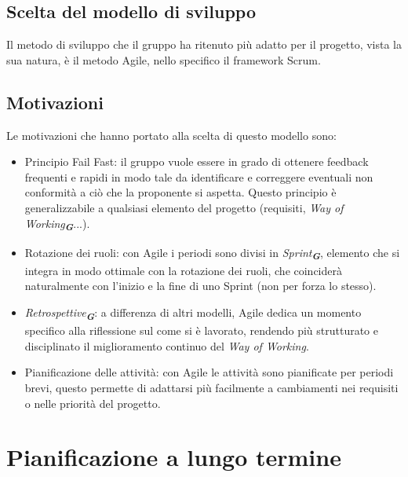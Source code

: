 \documentclass[a4paper,12pt]{article}
\newcommand{\glossario}[1]{\textit{#1}\textsubscript{\textbf{\textit{\textcolor{lightblack}{G}}}}}
\begin{document}
\subsection{Scelta del modello di sviluppo}
Il metodo di sviluppo che il gruppo ha ritenuto più adatto per il progetto, vista la sua natura, è il metodo Agile, nello specifico il framework Scrum.

\subsection{Motivazioni}
Le motivazioni che hanno portato alla scelta di questo modello sono:
\begin{itemize}
    \item Principio Fail Fast: il gruppo vuole essere in grado di ottenere feedback frequenti e rapidi in modo tale da identificare e correggere eventuali non conformità a ciò che la proponente si aspetta. Questo principio è generalizzabile a qualsiasi elemento del progetto (requisiti, \glossario{Way of Working}...).
    \item Rotazione dei ruoli: con Agile i periodi sono divisi in \glossario{Sprint}, elemento che si integra in modo ottimale con la rotazione dei ruoli, che coinciderà naturalmente con l'inizio e la fine di uno Sprint (non per forza lo stesso).
    \item \glossario{Retrospettive}: a differenza di altri modelli, Agile dedica un momento specifico alla riflessione sul come si è lavorato, rendendo più strutturato e disciplinato il miglioramento continuo del \textit{Way of Working}.
    \item Pianificazione delle attività: con Agile le attività sono pianificate per periodi brevi, questo permette di adattarsi più facilmente a cambiamenti nei requisiti o nelle priorità del progetto.
\end{itemize}



\section{Pianificazione a lungo termine}
\end{document}
